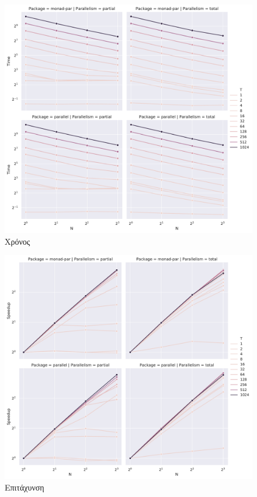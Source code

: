 \documentclass[titlepage]{article}
\begin{document}
\begin{figure}[!ht]
    \includegraphics[width=\textwidth]{time.pdf}
    \caption{Χρόνος}
\end{figure}

\begin{figure}[!ht]
    \includegraphics[width=\textwidth]{speedup.pdf}
    \caption{Επιτάχυνση}
\end{figure}
\end{document}
